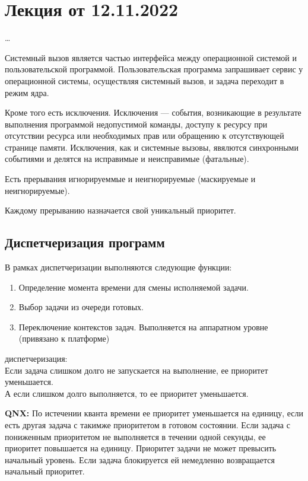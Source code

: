 
\section{Лекция от 12.11.2022}

\dots

Системный вызов является частью интерфейса между операционной системой и
пользовательской программой. Пользовательская программа запрашивает сервис у
операционной системы, осуществляя системный вызов, и задача переходит в режим
ядра.

Кроме того есть исключения. Исключения --- события, возникающие в результате
выполнения программой недопустимой команды, доступу к ресурсу при отсутствии
ресурса или необходимых прав или обращению к отсутствующей странице памяти.
Исключения, как и системные вызовы, явялются синхронными событиями и делятся на
исправимые и неисправимые (фатальные).

Есть прерывания игнорируеммые и неигнорируемые (маскируемые и неигнорируемые).

Каждому прерыванию назначается свой уникальный приоритет.

\subsection{Диспетчеризация программ}
В рамках диспетчеризации выполняются следующие функции:
\begin{enumerate}
  \item Определение момента времени для смены исполняемой задачи.
  \item Выбор задачи из очереди готовых.
  \item Переключение контекстов задач. Выполняется на аппаратном уровне
    (привязано к платформе)
\end{enumerate}

{ диспетчеризация:}\\
Если задача слишком долго не запускается на выполнение, ее приоритет
уменьшается.\\
А если слишком долго выполняется, то ее приоритет уменьшается.

{\bf QNX:}
По истечении кванта времени ее приоритет уменьшается на единицу, если есть
другая задача с такимже приоритетом в готовом состоянии. Если задача с
пониженным приоритетом не выполняется в течении одной секунды, ее приоритет
повышается на единицу. Приоритет задачи не может превысить начальный уровень.
Если задача блокируется ей немедленно возвращается начальный приоритет.

